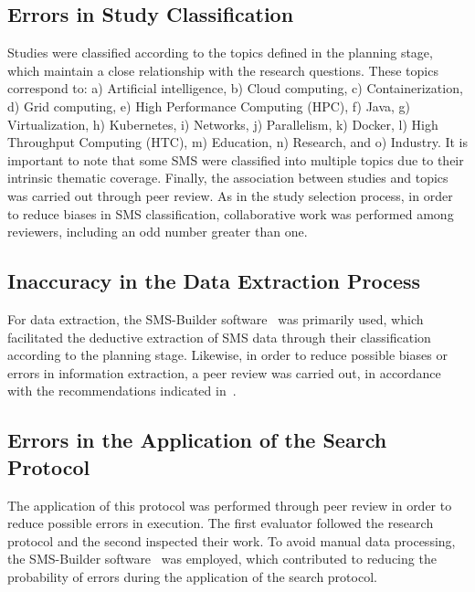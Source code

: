\subsection{Errors in Study Classification}
Studies were classified according to the topics defined in the planning stage, which maintain a close relationship with the research questions.
These topics correspond to: a) Artificial intelligence, b) Cloud computing, c) Containerization, d) Grid computing, e) High Performance Computing (HPC), f) Java, g) Virtualization, h) Kubernetes, i) Networks, j) Parallelism, k) Docker, l) High Throughput Computing (HTC), m) Education, n) Research, and o) Industry.
It is important to note that some SMS were classified into multiple topics due to their intrinsic thematic coverage. Finally, the association between studies and topics was carried out through peer review. As in the study selection process, in order to reduce biases in SMS classification, collaborative work was performed among reviewers, including an odd number greater than one.

\subsection{Inaccuracy in the Data Extraction Process}
For data extraction, the SMS-Builder software~\cite{sms-builder-repo} was primarily used, which facilitated the deductive extraction of SMS data through their classification according to the planning stage. Likewise, in order to reduce possible biases or errors in information extraction, a peer review was carried out, in accordance with the recommendations indicated in~\cite{Kitchenham2010792}.

\subsection{Errors in the Application of the Search Protocol}
The application of this protocol was performed through peer review in order to reduce possible errors in execution. The first evaluator followed the research protocol and the second inspected their work. To avoid manual data processing, the SMS-Builder software~\cite{sms-builder-repo} was employed, which contributed to reducing the probability of errors during the application of the search protocol.
